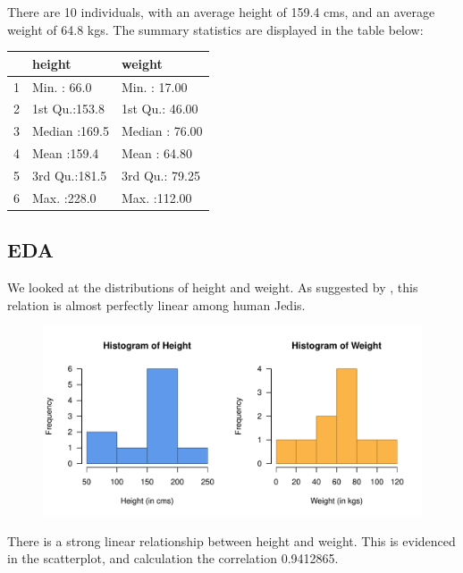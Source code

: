 \documentclass{article}\usepackage[]{graphicx}\usepackage[]{color}
\begin{document}
There are 10 individuals, with an average height of 159.4 cms, and an average weight of 64.8 kgs. The summary statistics are displayed in the table below:
\begin{table}[ht]
\centering
\begin{tabular}{rll}
  \hline
 &     height &     weight \\ 
  \hline
1 & Min.   : 66.0   & Min.   : 17.00   \\ 
  2 & 1st Qu.:153.8   & 1st Qu.: 46.00   \\ 
  3 & Median :169.5   & Median : 76.00   \\ 
  4 & Mean   :159.4   & Mean   : 64.80   \\ 
  5 & 3rd Qu.:181.5   & 3rd Qu.: 79.25   \\ 
  6 & Max.   :228.0   & Max.   :112.00   \\ 
   \hline
\end{tabular}
\end{table}


\subsection{EDA}
We looked at the distributions of height and weight. As suggested by \cite{ductavis}, this relation is almost perfectly linear among human Jedis.

\begin{figure}[h!]
\includegraphics[width=1\textwidth]{../images/histograms.pdf}
\end{figure}

There is a strong linear relationship between height and weight. This is evidenced in the scatterplot, and calculation the correlation 0.9412865.
\end{document}
